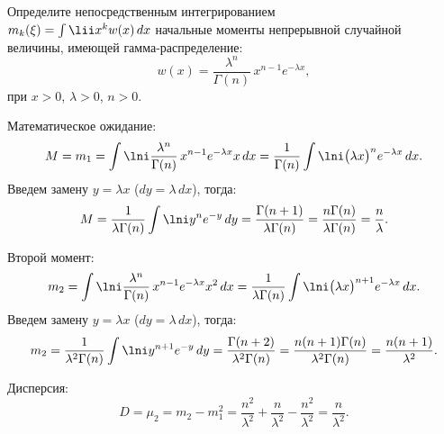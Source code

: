 \documentclass[pscyr]{hedwork}
\begin{document}
  \maketitle

  \begin{task}{4}{
    Определите непосредственным интегрированием \\
    \( m_k(\xi) = \int\lii x^k w(x)\,dx \) начальные моменты непрерывной
    случайной величины, имеющей гамма-распределение:
    \[
      w(x) = \frac{\lambda^n}{\Gamma(n)}\,x^{n - 1} e^{-\lambda x},
    \]
    при \( x > 0 \), \( \lambda > 0 \), \( n > 0 \).
  }

    Математическое ожидание:
    \[
      M = m_1 = \int\lni \frac{\lambda^n}{\Gamma(n)}\,x^{n - 1} e^{-\lambda x}
        x\,dx = \frac{1}{\Gamma(n)} \int\lni \bigl(\lambda x\big)^n
        e^{-\lambda x}\,dx.
    \]
    Введем замену \( y = \lambda x \) (\( dy = \lambda\,dx \)), тогда:
    \[
      M = \frac{1}{\lambda\Gamma(n)} \int\lni y^n e^{-y}\,dy =
        \frac{\Gamma(n + 1)}{\lambda\Gamma(n)} =
        \frac{n\Gamma(n)}{\lambda\Gamma(n)} = \frac{n}{\lambda}.
    \]

    Второй момент:
    \[
      m_2 = \int\lni \frac{\lambda^n}{\Gamma(n)}\,x^{n - 1} e^{-\lambda x}
        x^2\,dx = \frac{1}{\lambda\Gamma(n)} \int\lni
        \bigl(\lambda x\big)^{n + 1} e^{-\lambda x}\,dx.
    \]
    Введем замену \( y = \lambda x \) (\( dy = \lambda\,dx \)), тогда:
    \[
      m_2 = \frac{1}{\lambda^2 \Gamma(n)} \int\lni y^{n + 1} e^{-y}\,dy =
        \frac{\Gamma(n + 2)}{\lambda^2\Gamma(n)} =
        \frac{n(n + 1)\Gamma(n)}{\lambda^2\Gamma(n)} =
        \frac{n(n + 1)}{\lambda^2}.
    \]

    Дисперсия:
    \[
      D = \mu_2 = m_2 - m_1^2 = \frac{n^2}{\lambda^2} + \frac{n}{\lambda^2} -
        \frac{n^2}{\lambda^2} = \frac{n}{\lambda^2}.
    \]

  \end{task}
\end{document}
